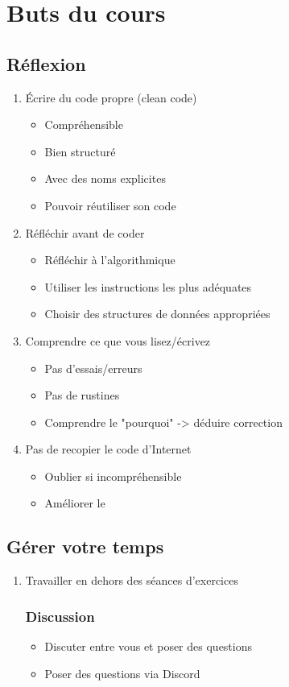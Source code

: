 \chapter{Buts du cours}
\section{Réflexion}
\begin{enumerate}
  \item Écrire du code propre (clean code)
  \begin{itemize}
    \item Compréhensible
    \item Bien structuré
    \item Avec des noms explicites
    \item Pouvoir réutiliser son code
  \end{itemize}
  \item Réfléchir avant de coder
  \begin{itemize}
    \item Réfléchir à l'algorithmique
    \item Utiliser les instructions les plus adéquates
    \item Choisir des structures de données appropriées
  \end{itemize}
  \item Comprendre ce que vous lisez/écrivez
  \begin{itemize}
    \item Pas d'essais/erreurs
    \item Pas de rustines
    \item Comprendre le "pourquoi" -> déduire correction
  \end{itemize}
  \item Pas de recopier le code d'Internet
  \begin{itemize}
    \item Oublier si incompréhensible
    \item Améliorer le
  \end{itemize}
\end{enumerate}
\section{Gérer votre temps}
\begin{enumerate}
  \item Travailler en dehors des séances d'exercices
  \subsection{Discussion}
  \begin{itemize}
    \item Discuter entre vous et poser des questions
    \item Poser des questions via Discord
  \end{itemize}
\end{enumerate}
